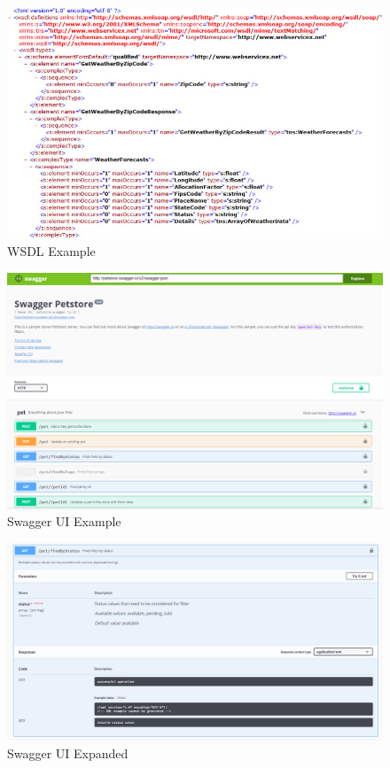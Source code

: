 \begin{figure}[!ht]
  \centering\includegraphics[width=\columnwidth]{images/wsdl-example.jpg}
  \caption{WSDL Example}\label{f:wsdl-example}
\end{figure}

\begin{figure}[!ht]
  \centering\includegraphics[width=\columnwidth]{images/swaggerui.png}
  \caption{Swagger UI Example}\label{f:swaggerui-example}
\end{figure}

\begin{figure}[!ht]
  \centering\includegraphics[width=\columnwidth]{images/swaggerui-expansion.png}
  \caption{Swagger UI Expanded}\label{f:swaggerui-expansion}
\end{figure}


